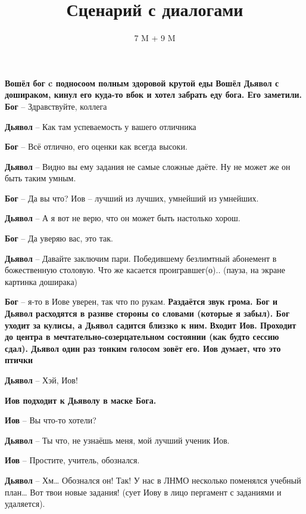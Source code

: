 \documentclass[10pt,a4paper]{article}
\author{7 M + 9 M}
\title{Сценарий с диалогами}
\begin{document}
\maketitle 
 
\textbf{Вошёл бог c подносоом полным здоровой крутой еды
}
\textbf{Вошёл Дьявол с дошираком, кинул его куда-то вбок и хотел забрать еду бога. Его заметили.
}
\newline
\newline
\textbf{Бог} -- Здравствуйте, коллега

\textbf{Дьявол} -- Как там успеваемость у вашего отличника 

\textbf{Бог} -- Всё отлично, его оценки как всегда высоки.

\textbf{Дьявол} -- Видно вы ему задания не самые сложные даёте. Ну не может же он быть таким умным.

\textbf{Бог} -- Да вы что? Иов -- лучший из лучших, умнейший из умнейших.

\textbf{Дьявол} -- А я вот не верю, что он может быть настолько хорош.

\textbf{Бог} -- Да уверяю вас, это так.

\textbf{Дьявол} -- Давайте заключим пари. Победившему безлимтный абонемент в божественную столовую. Что же касается проигравшег(о).. (пауза, на экране картинка доширака)

\textbf{Бог} -- я-то в Иове уверен, так что по рукам.
\newline
\newline
\textbf{Раздаётся звук грома. Бог и Дьявол расходятся в разнве стороны со словами (которые я забыл). Бог уходит за кулисы, а Дьявол садится близзко к ним.}
\newline
\newline
\textbf{Входит Иов. Проходит до центра в мечтательно-созерцательном состоянии (как будто сессию сдал). Дьявол один раз тонким голосом зовёт его. Иов думает, что это птички}
\newline
\newline

\textbf{Дьявол} -- Хэй, Иов!

\textbf{Иов подходит к Дьяволу в маске Бога.}

\textbf{Иов} -- Вы что-то хотели?

\textbf{Дьявол} -- Ты что, не узнаёшь меня, мой лучший ученик Иов.

\textbf{Иов} -- Простите, учитель, обознался.

\textbf{Дьявол} -- Хм… Обознался он! Так! У нас в ЛНМО несколько поменялся учебный план… Вот твои новые задания! (сует Иову в лицо пергамент с заданиями и удаляется).
\end{document}
